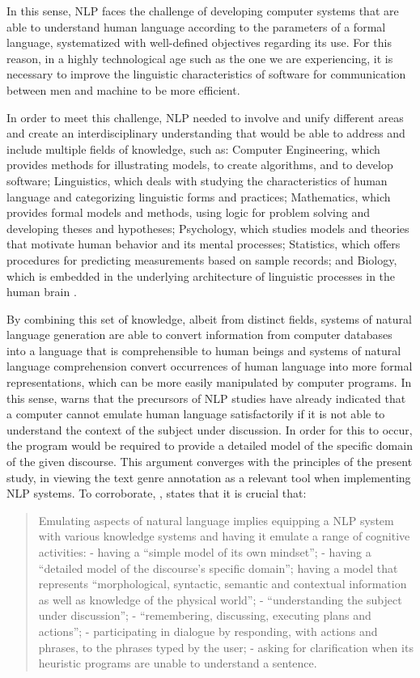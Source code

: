 \documentclass[english]{textolivre}
\begin{document}
In this sense, NLP faces the challenge of developing computer systems that are able to understand human language according to the parameters of a formal language, systematized with well-defined objectives regarding its use. For this reason, in a highly technological age such as the one we are experiencing, it is necessary to improve the linguistic characteristics of software for communication between men and machine to be more efficient.

In order to meet this challenge, NLP needed to involve and unify different areas and create an interdisciplinary understanding that would be able to address and include multiple fields of knowledge, such as: Computer Engineering, which provides methods for illustrating models, to create algorithms, and to develop software; Linguistics, which deals with studying the characteristics of human language and categorizing linguistic forms and practices; Mathematics, which provides formal models and methods, using logic for problem solving and developing theses and hypotheses; Psychology, which studies models and theories that motivate human behavior and its mental processes; Statistics, which offers procedures for predicting measurements based on sample records; and Biology, which is embedded in the underlying architecture of linguistic processes in the human brain \cite{manaris_natural_1998}.

By combining this set of knowledge, albeit from distinct fields, systems of natural language generation are able to convert information from computer databases into a language that is comprehensible to human beings and systems of natural language comprehension convert occurrences of human language into more formal representations, which can be more easily manipulated by computer programs. In this sense, \textcite{Silva_2006} warns that the precursors of NLP studies have already indicated that a computer cannot emulate human language satisfactorily if it is not able to understand the context of the subject under discussion. In order for this to occur, the program would be required to provide a detailed model of the specific domain of the given discourse. This argument converges with the principles of the present study, in viewing the text genre annotation as a relevant tool when implementing NLP systems. To corroborate, \textcite{Silva_2006}, states that it is crucial that:

\begin{quote}
    Emulating aspects of natural language implies equipping a NLP system with various knowledge systems and having it emulate a range of cognitive activities: - having a “simple model of its own mindset”; - having a “detailed model of the discourse’s specific domain”; having a model that represents “morphological, syntactic, semantic and contextual information as well as knowledge of the physical world”; - “understanding the subject under discussion”; - “remembering, discussing, executing plans and actions”; - participating in dialogue by responding, with actions and phrases, to the phrases typed by the user; - asking for clarification when its heuristic programs are unable to understand a sentence. \cite[p. 122]{Silva_2006}
\end{quote}
\end{document}
